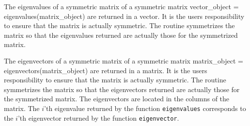 The eigenvalues of a symmetric matrix 
 {of a symmetric matrix}
\beginexample
vector_object = eigenvalues(matrix_object)
\endexample
\noindent are returned in a vector. It is the users responsibility to 
ensure that the matrix is actually symmetric. The routine symmetrizes 
the matrix so that the eigenvalues returned are actually those for
the symmetrized matrix.

The eigenvectors of a symmetric matrix 
 {of a symmetric matrix}
\beginexample
matrix_object = eigenvectors(matrix_object)
\endexample
\noindent are returned in a matrix. It is the users responsibility to 
ensure that the matrix is actually symmetric. The routine symmetrizes 
the matrix so that the eigenvectors returned are actually those for
the symmetrized matrix. The eigenvectors are located in the
columns of the matrix. The $i$'th eigenvalue returned by the
function {\tt eigenvalues} corresponds to the $i$'th eigenvector  
returned by the function {\tt eigenvector}.

